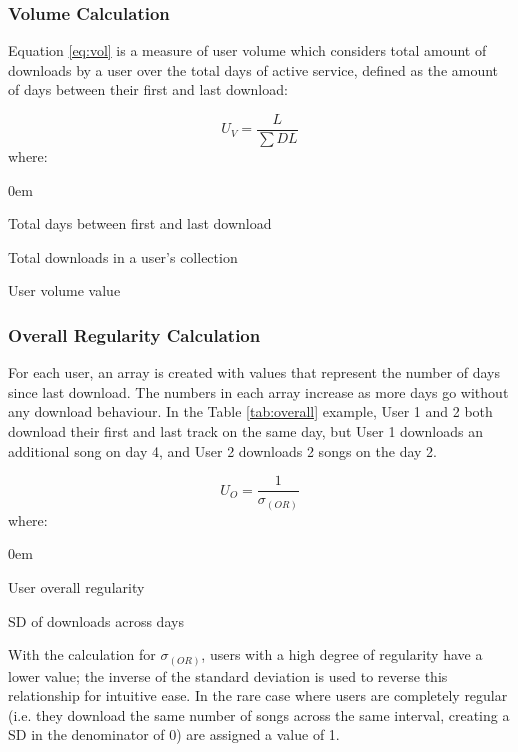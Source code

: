 \documentclass[a4paper]{article}
\begin{document}
\subsubsection{Volume Calculation}\label{app:vol}
Equation \ref{eq:vol} is a measure of user volume which considers total amount of downloads by a user over the total days of active service, defined as the amount of days between their first and last download:

\begin{equation}\label{eq:vol}
U_V = \frac{L}{\sum DL}
\end{equation}
where:
\begin{description}\itemsep0em
\item[$L$:] Total days between first and last download
\item[$DL$:] Total downloads in a user's collection
\item[$U_V$:] User volume value
\end{description}

\subsubsection{Overall Regularity Calculation}\label{sec:oreg}
For each user, an array is created with values that represent the number of days since last download. The numbers in each array increase as more days go without any download behaviour. In the Table \ref{tab:overall} example, User 1 and 2 both download their first and last track on the same day, but User 1 downloads an additional song on day 4, and User 2 downloads 2 songs on the day 2. 

\begin{equation}
U_O = \frac{1}{\sigma_{(OR)}} 
\label{eq:overall}
\end{equation}
where:
\begin{description}\itemsep0em
\item[$U_O$:] User overall regularity
\item[$\sigma_(OR)$:] SD of downloads across days
\end{description}

With the calculation for $\sigma_{(OR)}$, users with a high degree of regularity have a lower value; the inverse of the standard deviation is used to reverse this relationship for intuitive ease. In the rare case where users are completely regular (i.e. they download the same number of songs across the same interval, creating a SD in the denominator of 0) are assigned a value of 1.
\end{document}
